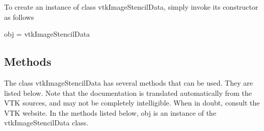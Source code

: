 To create an instance of class vtk\-Image\-Stencil\-Data, simply invoke its constructor as follows \begin{DoxyVerb}  obj = vtkImageStencilData
\end{DoxyVerb}
 \hypertarget{vtkwidgets_vtkxyplotwidget_Methods}{}\subsection{Methods}\label{vtkwidgets_vtkxyplotwidget_Methods}
The class vtk\-Image\-Stencil\-Data has several methods that can be used. They are listed below. Note that the documentation is translated automatically from the V\-T\-K sources, and may not be completely intelligible. When in doubt, consult the V\-T\-K website. In the methods listed below, {\ttfamily obj} is an instance of the vtk\-Image\-Stencil\-Data class. 
